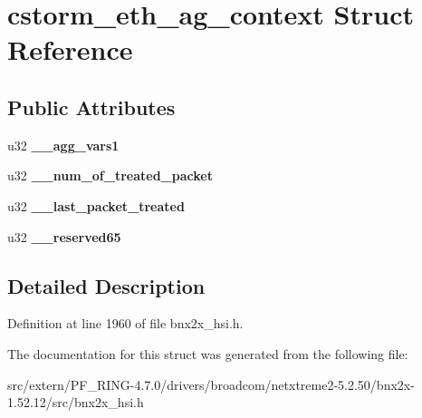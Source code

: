 \hypertarget{structcstorm__eth__ag__context}{
\section{cstorm\_\-eth\_\-ag\_\-context Struct Reference}
\label{structcstorm__eth__ag__context}
}
\subsection*{Public Attributes}
\begin{DoxyCompactItemize}
\item 
\hypertarget{structcstorm__eth__ag__context_a689977495587c7bd0be9c0f9a20ab910}{
u32 {\bfseries \_\-\_\-agg\_\-vars1}}
\label{structcstorm__eth__ag__context_a689977495587c7bd0be9c0f9a20ab910}

\item 
\hypertarget{structcstorm__eth__ag__context_ab8599dab4bc3d997612e494c740da115}{
u32 {\bfseries \_\-\_\-num\_\-of\_\-treated\_\-packet}}
\label{structcstorm__eth__ag__context_ab8599dab4bc3d997612e494c740da115}

\item 
\hypertarget{structcstorm__eth__ag__context_a11e461c1f550fdd216745972af22673c}{
u32 {\bfseries \_\-\_\-last\_\-packet\_\-treated}}
\label{structcstorm__eth__ag__context_a11e461c1f550fdd216745972af22673c}

\item 
\hypertarget{structcstorm__eth__ag__context_a2c292c7b711c97841d60836ff572dfe8}{
u32 {\bfseries \_\-\_\-reserved65}}
\label{structcstorm__eth__ag__context_a2c292c7b711c97841d60836ff572dfe8}

\end{DoxyCompactItemize}


\subsection{Detailed Description}


Definition at line 1960 of file bnx2x\_\-hsi.h.



The documentation for this struct was generated from the following file:\begin{DoxyCompactItemize}
\item 
src/extern/PF\_\-RING-\/4.7.0/drivers/broadcom/netxtreme2-\/5.2.50/bnx2x-\/1.52.12/src/bnx2x\_\-hsi.h\end{DoxyCompactItemize}
